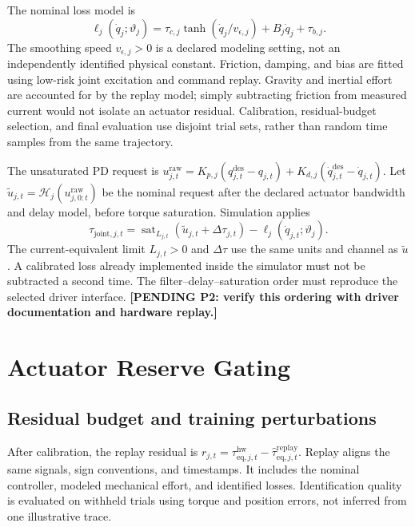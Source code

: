 \documentclass[11pt,a4paper]{article}
\newcommand{\pending}[1]{\textbf{[PENDING #1]}}
\newcommand{\sat}{\operatorname{sat}}
\begin{document}
The nominal loss model is
\begin{equation}
 \ell_j(\dot q_j;\vartheta_j)=\tau_{c,j}\tanh(\dot q_j/v_{\epsilon,j})+B_j\dot q_j+\tau_{b,j}.
\end{equation}
The smoothing speed $v_{\epsilon,j}>0$ is a declared modeling setting, not an independently identified physical constant. Friction, damping, and bias are fitted using low-risk joint excitation and command replay. Gravity and inertial effort are accounted for by the replay model; simply subtracting friction from measured current would not isolate an actuator residual. Calibration, residual-budget selection, and final evaluation use disjoint trial sets, rather than random time samples from the same trajectory.

The unsaturated PD request is $u^{\mathrm{raw}}_{j,t}=K_{p,j}(q^{\mathrm{des}}_{j,t}-q_{j,t})+K_{d,j}(\dot q^{\mathrm{des}}_{j,t}-\dot q_{j,t})$. Let $\tilde u_{j,t}=\mathcal H_j(u^{\mathrm{raw}}_{j,0:t})$ be the nominal request after the declared actuator bandwidth and delay model, before torque saturation. Simulation applies
\begin{equation}
 \tau_{\mathrm{joint},j,t}=\sat_{L_{j,t}}(\tilde u_{j,t}+\Delta\tau_{j,t})-\ell_j(\dot q_{j,t};\vartheta_j).
 \label{eq:channel}
\end{equation}
The current-equivalent limit $L_{j,t}>0$ and $\Delta\tau$ use the same units and channel as $\tilde u$. A calibrated loss already implemented inside the simulator must not be subtracted a second time. The filter--delay--saturation order must reproduce the selected driver interface. \pending{P2: verify this ordering with driver documentation and hardware replay.}

\section{Actuator Reserve Gating}
\subsection{Residual budget and training perturbations}
After calibration, the replay residual is $r_{j,t}=\tau^{\mathrm{hw}}_{\mathrm{eq},j,t}-\widehat\tau^{\mathrm{replay}}_{\mathrm{eq},j,t}$. Replay aligns the same signals, sign conventions, and timestamps. It includes the nominal controller, modeled mechanical effort, and identified losses. Identification quality is evaluated on withheld trials using torque and position errors, not inferred from one illustrative trace.
\end{document}
